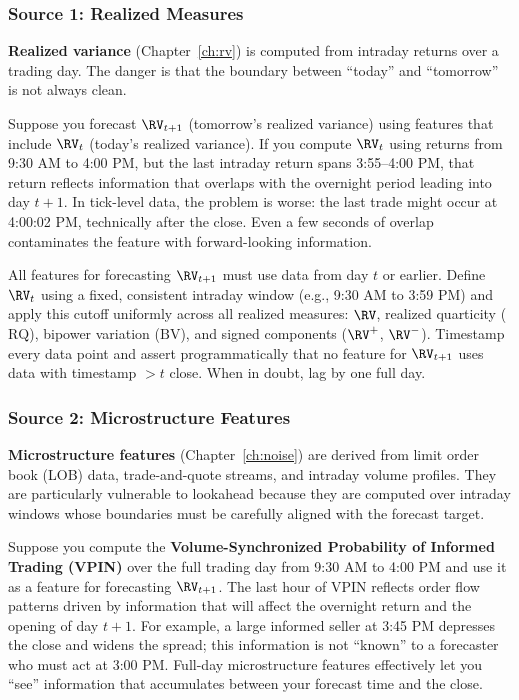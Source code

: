 \subsubsection{Source 1: Realized Measures}

\textbf{Realized variance} (Chapter~\ref{ch:rv}) is computed from intraday returns over a trading day.
The danger is that the boundary between ``today'' and ``tomorrow'' is not always clean.

\begin{warning}
Suppose you forecast $\RV_{t+1}$ (tomorrow's realized variance) using features that include $\RV_t$ (today's realized variance).
If you compute $\RV_t$ using returns from 9:30 AM to 4:00 PM, but the last intraday return spans 3:55--4:00 PM, that return reflects information that overlaps with the overnight period leading into day $t+1$.
In tick-level data, the problem is worse: the last trade might occur at 4:00:02 PM, technically after the close.
Even a few seconds of overlap contaminates the feature with forward-looking information.
\end{warning}

\begin{keyidea}
All features for forecasting $\RV_{t+1}$ must use data from day $t$ or earlier.
Define $\RV_t$ using a fixed, consistent intraday window (e.g., 9:30 AM to 3:59 PM) and apply this cutoff uniformly across all realized measures: $\RV$, realized quarticity ($\text{RQ}$), bipower variation ($\text{BV}$), and signed components ($\RV^+$, $\RV^-$).
Timestamp every data point and assert programmatically that no feature for $\RV_{t+1}$ uses data with timestamp $> t$ close.
When in doubt, lag by one full day.
\end{keyidea}


\subsubsection{Source 2: Microstructure Features}

\textbf{Microstructure features} (Chapter~\ref{ch:noise}) are derived from limit order book (LOB) data, trade-and-quote streams, and intraday volume profiles.
They are particularly vulnerable to lookahead because they are computed over intraday windows whose boundaries must be carefully aligned with the forecast target.

\begin{warning}
Suppose you compute the \textbf{Volume-Synchronized Probability of Informed Trading (VPIN)} over the full trading day from 9:30 AM to 4:00 PM and use it as a feature for forecasting $\RV_{t+1}$.
The last hour of VPIN reflects order flow patterns driven by information that will affect the overnight return and the opening of day $t+1$.
For example, a large informed seller at 3:45 PM depresses the close and widens the spread; this information is not ``known'' to a forecaster who must act at 3:00 PM.
Full-day microstructure features effectively let you ``see'' information that accumulates between your forecast time and the close.
\end{warning}

